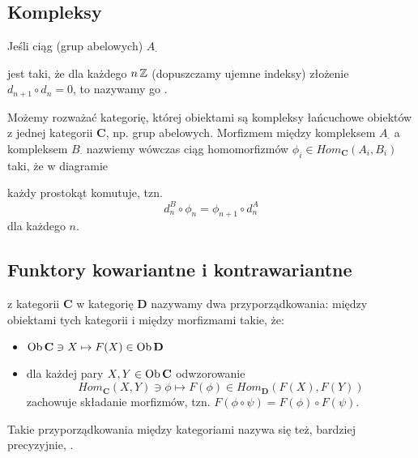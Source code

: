 \subsection{Kompleksy}

\begin{definition}
  Jeśli ciąg (grup abelowych) $A_\cdot$
  \begin{center}\end{center}
  jest taki, że dla każdego $n\operatorname{\mathbb{Z}}$ (dopuszczamy ujemne indeksy) złożenie $d_{n+1}\circ d_n=0$, to nazywamy go .
\end{definition}

Możemy rozważać kategorię, której obiektami są kompleksy łańcuchowe obiektów z jednej kategorii $\mathbf{C}$, np. grup abelowych. Morfizmem między kompleksem $A_\cdot$ a kompleksem $B_\cdot$ nazwiemy wówczas ciąg homomorfizmów $\phi_i\in Hom_{\mathbf{C}}(A_i,B_i)$ taki, że w diagramie
  \begin{center}\end{center}
każdy prostokąt komutuje, tzn.
$$d^B_n\circ\phi_n=\phi_{n+1}\circ d_{n}^A$$
dla każdego $n$.

\subsection{Funktory kowariantne i kontrawariantne}

\begin{definition}[funktor]
   z kategorii $\mathbf{C}$ w kategorię $\mathbf{D}$ nazywamy dwa przyporządkowania: między obiektami tych kategorii i między morfizmami takie, że:
  \begin{itemize}
    \item $\operatorname{Ob}\mathbf{C}\ni X\mapsto F(X)\in\operatorname{Ob}\mathbf{D}$
    \item dla każdej pary $X,Y\in\operatorname{Ob}\mathbf{C}$ odwzorowanie
      $$Hom_{\mathbf{C}}(X, Y)\ni \phi\mapsto F(\phi)\in Hom_{\mathbf{D}}(F(X),F(Y))$$
      zachowuje składanie morfizmów, tzn. $F(\phi\circ\psi)=F(\phi)\circ F(\psi)$.
  \end{itemize}

  Takie przyporządkowania między kategoriami nazywa się też, bardziej precyzyjnie, .
\end{definition}

